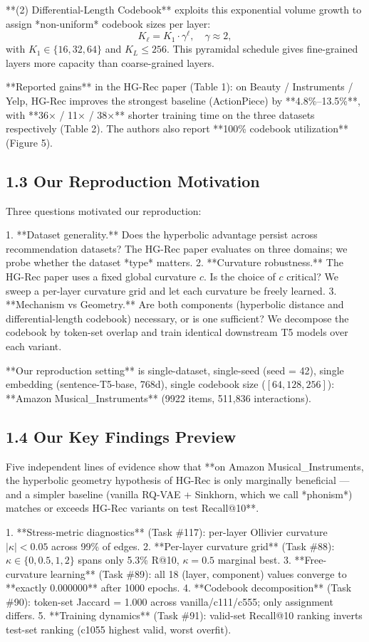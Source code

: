 \documentclass[11pt]{article}
\begin{document}
**(2) Differential-Length Codebook** exploits this exponential volume growth to assign *non-uniform* codebook sizes per layer:
$$K_\ell = K_1 \cdot \gamma^\ell, \quad \gamma \approx 2,$$
with $K_1 \in \{16, 32, 64\}$ and $K_L \le 256$. This pyramidal schedule gives fine-grained layers more capacity than coarse-grained layers.

**Reported gains** in the HG-Rec paper (Table 1): on Beauty / Instruments / Yelp, HG-Rec improves the strongest baseline (ActionPiece) by **4.8\%–13.5\%**, with **36× / 11× / 38×** shorter training time on the three datasets respectively (Table 2). The authors also report **100\% codebook utilization** (Figure 5).


\subsection{1.3 Our Reproduction Motivation}

Three questions motivated our reproduction:

1. **Dataset generality.** Does the hyperbolic advantage persist across recommendation datasets? The HG-Rec paper evaluates on three domains; we probe whether the dataset *type* matters.
2. **Curvature robustness.** The HG-Rec paper uses a fixed global curvature $c$. Is the choice of $c$ critical? We sweep a per-layer curvature grid and let each curvature be freely learned.
3. **Mechanism vs Geometry.** Are both components (hyperbolic distance and differential-length codebook) necessary, or is one sufficient? We decompose the codebook by token-set overlap and train identical downstream T5 models over each variant.

**Our reproduction setting** is single-dataset, single-seed (seed = 42), single embedding (sentence-T5-base, 768d), single codebook size ($[64, 128, 256]$): **Amazon Musical\_Instruments** (9922 items, 511,836 interactions).


\subsection{1.4 Our Key Findings Preview}

Five independent lines of evidence show that **on Amazon Musical\_Instruments, the hyperbolic geometry hypothesis of HG-Rec is only marginally beneficial — and a simpler baseline (vanilla RQ-VAE + Sinkhorn, which we call *phonism*) matches or exceeds HG-Rec variants on test Recall@10**.

1. **Stress-metric diagnostics** (Task \#117): per-layer Ollivier curvature $|\kappa| < 0.05$ across 99\% of edges.
2. **Per-layer curvature grid** (Task \#88): $\kappa \in \{0, 0.5, 1, 2\}$ spans only 5.3\% R@10, $\kappa=0.5$ marginal best.
3. **Free-curvature learning** (Task \#89): all 18 (layer, component) values converge to **exactly $0.000000$** after 1000 epochs.
4. **Codebook decomposition** (Task \#90): token-set Jaccard = 1.000 across vanilla/c111/c555; only assignment differs.
5. **Training dynamics** (Task \#91): valid-set Recall@10 ranking inverts test-set ranking (c1055 highest valid, worst overfit).
\end{document}
